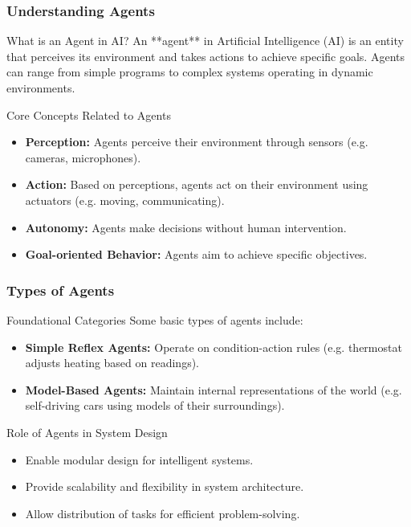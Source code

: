 \documentclass[aspectratio=169]{beamer}
\begin{document}
\begin{frame}[fragile]
    \frametitle{Understanding Agents}
    
    \begin{block}{What is an Agent in AI?}
        An **agent** in Artificial Intelligence (AI) is an entity that perceives its environment and takes actions to achieve specific goals. Agents can range from simple programs to complex systems operating in dynamic environments.
    \end{block}
    
    \begin{block}{Core Concepts Related to Agents}
        \begin{itemize}
            \item \textbf{Perception:} Agents perceive their environment through sensors (e.g. cameras, microphones).
            \item \textbf{Action:} Based on perceptions, agents act on their environment using actuators (e.g. moving, communicating).
            \item \textbf{Autonomy:} Agents make decisions without human intervention.
            \item \textbf{Goal-oriented Behavior:} Agents aim to achieve specific objectives.
        \end{itemize}
    \end{block}
\end{frame}

\begin{frame}[fragile]
    \frametitle{Types of Agents}
    
    \begin{block}{Foundational Categories}
        Some basic types of agents include:
        \begin{itemize}
            \item \textbf{Simple Reflex Agents:} Operate on condition-action rules (e.g. thermostat adjusts heating based on readings).
            \item \textbf{Model-Based Agents:} Maintain internal representations of the world (e.g. self-driving cars using models of their surroundings).
        \end{itemize}
    \end{block}
    
    \begin{block}{Role of Agents in System Design}
        \begin{itemize}
            \item Enable modular design for intelligent systems.
            \item Provide scalability and flexibility in system architecture.
            \item Allow distribution of tasks for efficient problem-solving.
        \end{itemize}
    \end{block}
\end{frame}
\end{document}
